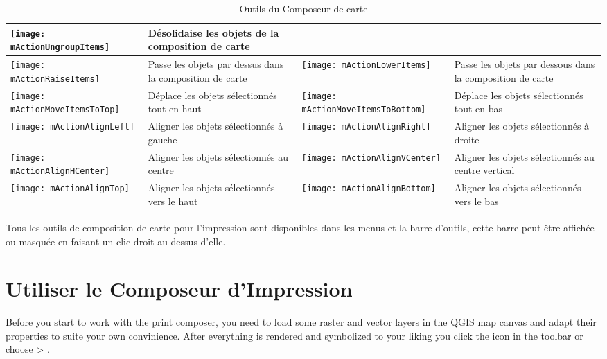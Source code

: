\begin{table}[p]
\begin{tabular}{|m{1cm}|m{5.4cm}|m{1cm}|m{5.4cm}|}
 \texttt{[image: mActionUngroupItems]} & Désolidaise les objets de la composition de carte \\
\hline \texttt{[image: mActionRaiseItems]} & Passe les objets par dessus dans la composition de carte &
 \texttt{[image: mActionLowerItems]} & Passe les objets par dessous dans la composition de carte \\
\hline \texttt{[image: mActionMoveItemsToTop]} & Déplace les objets sélectionnés tout en haut & 
 \texttt{[image: mActionMoveItemsToBottom]} & Déplace les objets sélectionnés tout en bas \\
 \hline \texttt{[image: mActionAlignLeft]} & Aligner les objets sélectionnés à gauche &
 \texttt{[image: mActionAlignRight]} & Aligner les objets sélectionnés à droite \\
 \hline \texttt{[image: mActionAlignHCenter]} & Aligner les objets sélectionnés au centre &
 \texttt{[image: mActionAlignVCenter]} & Aligner les objets sélectionnés au centre vertical \\
 \hline \texttt{[image: mActionAlignTop]} & Aligner les objets sélectionnés vers le haut &
 \texttt{[image: mActionAlignBottom]} & Aligner les objets sélectionnés  vers le bas \\
\hline
\end{tabular}
\caption{Outils du Composeur de carte}\label{tab:printcomposer_tools}
\end{table}


Tous les outils de composition de carte pour l'impression sont disponibles dans les menus et la barre d'outils, cette barre peut être affichée ou masquée en faisant un clic droit au-dessus d'elle.

\section{Utiliser le Composeur d'Impression}\label{label_useprintcomposer} 

Before you start to work with the print composer, you need to load some
raster and vector layers in the QGIS map canvas and adapt their properties
to suite your own convinience. After everything is rendered and symbolized to
your liking you click the 
icon in the toolbar or choose  >
.


